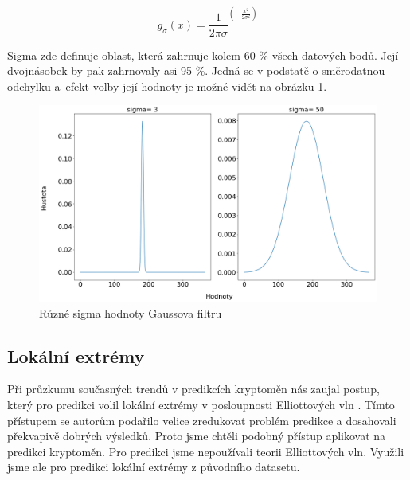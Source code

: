 \[g_\sigma (x)= \frac{1}{2\pi \sigma }^{(-\frac{x^2}{2\sigma ^2})}\]

Sigma zde definuje oblast, která zahrnuje kolem 60 \% všech datových bodů. 
Její dvojnásobek by pak zahrnovaly asi 95 \%. 
Jedná se v podstatě o směrodatnou odchylku a~efekt volby její hodnoty je možné vidět na obrázku \ref{visual:sigma}.

\begin{figure}
    \caption{Různé sigma hodnoty Gaussova filtru}
    \label{visual:sigma}
    \centering
    \includegraphics[width=\textwidth]{sigma.png}
\end{figure}

\subsection{Lokální extrémy}

Při průzkumu současných trendů v predikcích kryptoměn nás zaujal postup, který pro predikci volil lokální extrémy v posloupnosti Elliottových vln \cite{event-driven}. 
Tímto přístupem se autorům podařilo velice zredukovat problém predikce a dosahovali překvapivě dobrých výsledků. 
Proto jsme chtěli podobný přístup aplikovat na predikci kryptoměn. 
Pro predikci jsme nepoužívali teorii Elliottových vln.
Využili jsme ale pro predikci lokální extrémy z původního datasetu.


